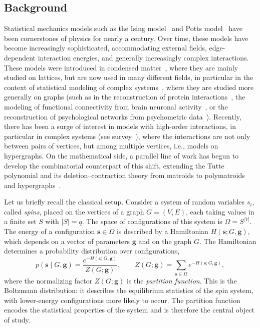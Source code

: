 \documentclass[11pt,reqno]{amsart}
\newcommand{\vecs}{\boldsymbol{s}}
\newcommand{\vecg}{\boldsymbol{g}}
\newcommand{\statespace}{\Omega}
\theoremstyle{plain}
\theoremstyle{definition}
\numberwithin{equation}{section}
\begin{document}
\subsection{Background}
\label{sec:background}
Statistical mechanics models such as the Ising model~\cite{LenzBeitragZV, isingBeitragZurTheorie1925} and Potts model~\cite{wu1982potts} have been cornerstones of physics for nearly a century. Over time, these models have become increasingly sophisticated, accommodating external fields, edge-dependent interaction energies, and generally increasingly complex interactions. These models were introduced in condensed matter~\cite{Bax82}, where they are mainly studied on lattices, but are now used in many different fields, in particular in the context of statistical modeling of complex systems~\cite{Nguyen2017}, where they are studied more generally on graphs (such as in the reconstruction of protein interactions~\cite{Cocco2018}, the modeling of functional connectivity from brain neuronal activity~\cite{savin2017maximum}, or the reconstruction of psychological networks from psychometric data~\cite{borsboom2021network}).
Recently, there has been a surge of interest in models with high-order interactions, in particular in complex systems (see survey~\cite{battiston2021physics}), where the interactions are not only between pairs of vertices, but among multiple vertices, i.e., models on hypergraphs. On the mathematical side, a parallel line of work has begun to develop the combinatorial counterpart of this shift, extending the Tutte polynomial and its deletion--contraction theory from matroids to polymatroids and hypergraphs~\cite{kalman2013version, bernardi2022universal, guan2023deletion, Berrekkal2026, chavez2021new}.


Let us
briefly recall the classical setup. Consider a system of random variables $s_i$, called \emph{spins}, placed on the vertices of a graph $G = (V,E)$, each taking values in a finite set $S$ with $|S| = q$. The space of configurations of this system is $\statespace = S^{|V|}$. The energy of a configuration $\vecs \in \statespace$ is described by a Hamiltonian $H(\vecs; G, \vecg)$, which depends on a vector of parameters $\vecg$ and on the graph $G$. The Hamiltonian determines a probability distribution over configurations,
\[
    p(\vecs \mid G, \vecg) = \frac{e^{-H(\vecs;\,G, \vecg)}}{Z(G; \vecg)},
    \qquad
    Z(G; \vecg) = \sum_{\vecs \in \statespace} e^{-H(\vecs; G, \vecg)},
\]
where the normalizing factor $Z(G; \vecg)$ is the \emph{partition function}. This is the Boltzmann distribution: it describes the equilibrium statistics of the spin system, with lower-energy configurations more likely to occur. The partition function encodes the statistical properties of the system and is therefore the central object of study.
\end{document}
